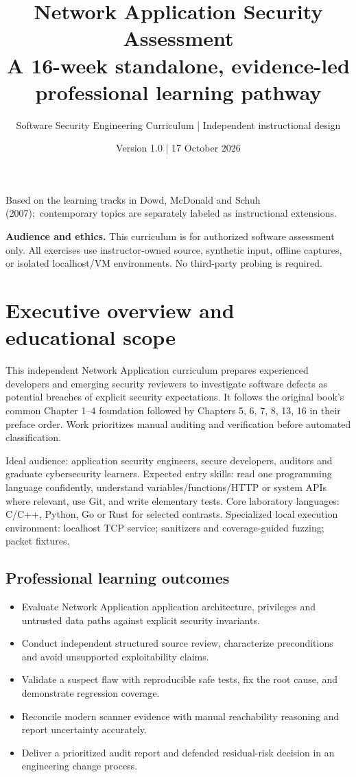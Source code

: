 \documentclass[10pt,letterpaper]{article}
\title{\vspace{-1.6cm}\Huge\color{navy}\bfseries Network Application Security Assessment\\[8pt]\large\color{teal}A 16-week standalone, evidence-led professional learning pathway}
\author{Software Security Engineering Curriculum | Independent instructional design}
\date{Version 1.0 | 17 October 2026}
\begin{document}
\maketitle
\begin{center}\small Based on the learning tracks in Dowd, McDonald and Schuh (2007);\
contemporary topics are separately labeled as instructional extensions.\end{center}
\begin{insight}\textbf{Audience and ethics.} This curriculum is for authorized software assessment only. All exercises use instructor-owned source, synthetic input, offline captures, or isolated localhost/VM environments. No third-party probing is required.\end{insight}
\tableofcontents
\clearpage
\section{Executive overview and educational scope}
This independent Network Application curriculum prepares experienced developers and emerging security reviewers to investigate software defects as potential breaches of explicit security expectations. It follows the original book's common Chapter 1--4 foundation followed by Chapters 5, 6, 7, 8, 13, 16 in their preface order. Work prioritizes manual auditing and verification before automated classification.

Ideal audience: application security engineers, secure developers, auditors and graduate cybersecurity learners. Expected entry skills: read one programming language confidently, understand variables/functions/HTTP or system APIs where relevant, use Git, and write elementary tests. Core laboratory languages: C/C++, Python, Go or Rust for selected contrasts. Specialized local execution environment: localhost TCP service; sanitizers and coverage-guided fuzzing; packet fixtures.

\subsection{Professional learning outcomes}
\begin{itemize}[leftmargin=*,itemsep=2pt]
\item Evaluate Network Application application architecture, privileges and untrusted data paths against explicit security invariants.
\item Conduct independent structured source review, characterize preconditions and avoid unsupported exploitability claims.
\item Validate a suspect flaw with reproducible safe tests, fix the root cause, and demonstrate regression coverage.
\item Reconcile modern scanner evidence with manual reachability reasoning and report uncertainty accurately.
\item Deliver a prioritized audit report and defended residual-risk decision in an engineering change process.
\end{itemize}
\end{document}
